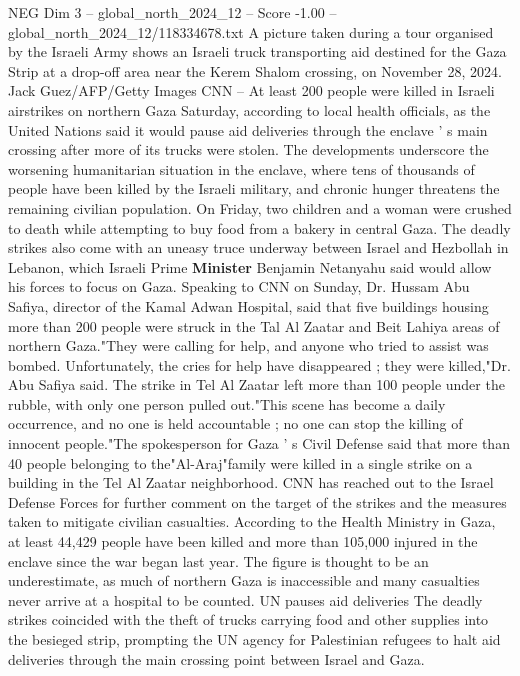 \begin{textsample}{NEG Dim 3 – global\_north\_2024\_12 – Score -1.00 – global\_north\_2024\_12/118334678.txt}  \label{ex:f3_neg_225}
A picture taken during a tour organised by the Israeli Army shows an Israeli truck transporting aid destined for the Gaza Strip at a drop-off area near the Kerem Shalom crossing, on November 28, 2024.
Jack Guez/AFP/Getty Images CNN -- At least 200 people were killed in Israeli airstrikes on northern Gaza Saturday, according to local health officials, as the United Nations said it would pause aid deliveries through the enclave ' s main crossing after more of its trucks were stolen.
The developments underscore the worsening humanitarian situation in the enclave, where tens of thousands of people have been killed by the Israeli military, and chronic hunger threatens the remaining civilian population.
On Friday, two children and a woman were crushed to death while attempting to buy food from a bakery in central Gaza.
The deadly strikes also come with an uneasy truce underway between Israel and Hezbollah in Lebanon, which Israeli Prime \textbf{Minister} Benjamin Netanyahu said would allow his forces to focus on Gaza.
Speaking to CNN on Sunday, Dr.
Hussam Abu Safiya, director of the Kamal Adwan Hospital, said that five buildings housing more than 200 people were struck in the Tal Al Zaatar and Beit Lahiya areas of northern Gaza."They were calling for help, and anyone who tried to assist was bombed.
Unfortunately, the cries for help have disappeared ; they were killed,"Dr.
Abu Safiya said.
The strike in Tel Al Zaatar left more than 100 people under the rubble, with only one person pulled out."This scene has become a daily occurrence, and no one is held accountable ; no one can stop the killing of innocent people."The spokesperson for Gaza ' s Civil Defense said that more than 40 people belonging to the"Al-Araj"family were killed in a single strike on a building in the Tel Al Zaatar neighborhood.
CNN has reached out to the Israel Defense Forces for further comment on the target of the strikes and the measures taken to mitigate civilian casualties.
According to the Health Ministry in Gaza, at least 44,429 people have been killed and more than 105,000 injured in the enclave since the war began last year.
The figure is thought to be an underestimate, as much of northern Gaza is inaccessible and many casualties never arrive at a hospital to be counted.
UN pauses aid deliveries The deadly strikes coincided with the theft of trucks carrying food and other supplies into the besieged strip, prompting the UN agency for Palestinian refugees to halt aid deliveries through the main crossing point between Israel and Gaza.

\end{textsample}
